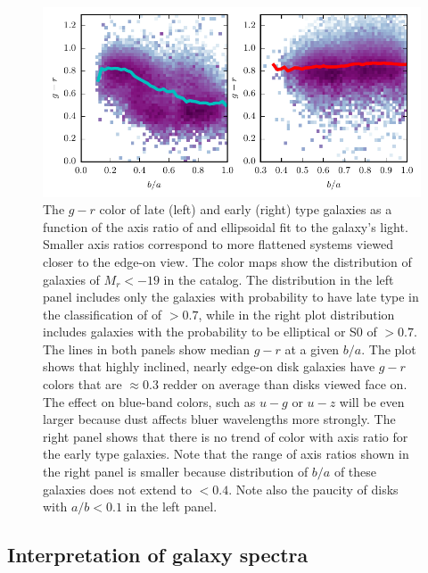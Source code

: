 \begin{figure}
\centerline{\includegraphics[scale=1.3]{fig/bagr_dust_meert.pdf}}
\caption{The $g-r$ color of late (left) and early (right) type galaxies as a function of the axis ratio of and ellipsoidal fit to the galaxy's light. Smaller axis ratios correspond to more flattened systems viewed closer to the edge-on view.  The color maps show the distribution of galaxies of $M_r<-19$ in the \href{http://adsabs.harvard.edu/abs/2015MNRAS.446.3943M}{\citet{meert_etal15}} catalog. 
The distribution in the left panel includes only the galaxies with probability to have late type in the classification of \protect\href{http://www.aanda.org/articles/aa/abs/2011/01/aa15735-10/aa15735-10.html}{\citet{huertas_company_etal11}} of $>0.7$, while in the right plot distribution includes galaxies with the probability to be elliptical or S0 of $>0.7$.  The lines in both panels show median $g-r$ at a given $b/a$.
The plot shows that highly inclined, nearly edge-on disk galaxies have $g-r$ colors that are $\approx 0.3$ redder on average than disks viewed face on. The effect on blue-band colors, such as $u-g$ or $u-z$ will be even larger because dust affects bluer wavelengths more strongly. The right panel shows that there is no trend of color with axis ratio for the early type galaxies. Note that the range of axis ratios shown in the right panel is smaller because distribution of $b/a$ of these galaxies does not extend to $<0.4$. Note also the paucity of disks with $a/b<0.1$ in the left panel.  \label{fig:colorinc}}
\end{figure}

\subsection{Interpretation of galaxy spectra}

